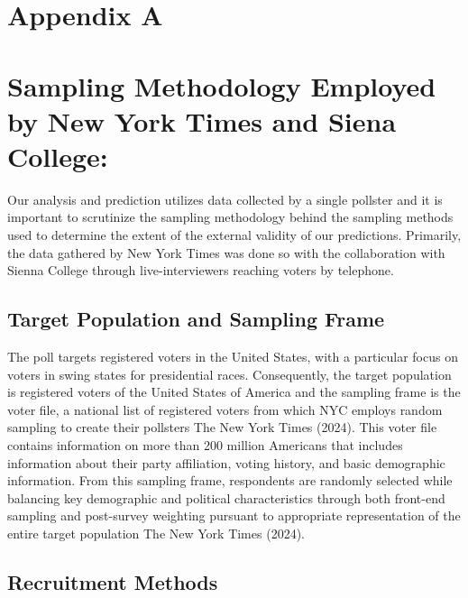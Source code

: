\documentclass[
  letterpaper,
  DIV=11,
  numbers=noendperiod]{scrartcl}
\begin{document}
\newpage

\appendix

\hypertarget{appendix-a}{%
\section*{Appendix A}\label{appendix-a}}

\hypertarget{sampling-methodology-employed-by-new-york-times-and-siena-college}{%
\section{Sampling Methodology Employed by New York Times and Siena
College:}\label{sampling-methodology-employed-by-new-york-times-and-siena-college}}

Our analysis and prediction utilizes data collected by a single pollster
and it is important to scrutinize the sampling methodology behind the
sampling methods used to determine the extent of the external validity
of our predictions. Primarily, the data gathered by New York Times was
done so with the collaboration with Sienna College through
live-interviewers reaching voters by telephone.

\hypertarget{target-population-and-sampling-frame}{%
\subsection{Target Population and Sampling
Frame}\label{target-population-and-sampling-frame}}

The poll targets registered voters in the United States, with a
particular focus on voters in swing states for presidential races.
Consequently, the target population is registered voters of the United
States of America and the sampling frame is the voter file, a national
list of registered voters from which NYC employs random sampling to
create their pollsters The New York Times (2024). This voter file
contains information on more than 200 million Americans that includes
information about their party affiliation, voting history, and basic
demographic information. From this sampling frame, respondents are
randomly selected while balancing key demographic and political
characteristics through both front-end sampling and post-survey
weighting pursuant to appropriate representation of the entire target
population The New York Times (2024).

\hypertarget{recruitment-methods}{%
\subsection{Recruitment Methods}\label{recruitment-methods}}
\end{document}
